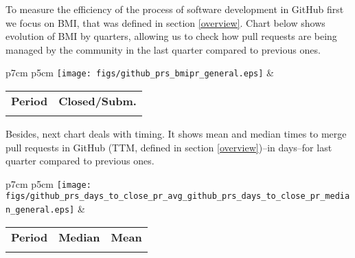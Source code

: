 To measure the efficiency of the process of software development in GitHub first we focus on BMI, that was defined in section \ref{overview}. Chart below shows evolution of BMI by quarters, allowing us to check how pull requests are being managed by the community in the last quarter compared to previous ones.

\begin{tabular}{p{7cm} p{5cm}}
	\vspace{0pt} 
	\texttt{[image: figs/github\_prs\_bmipr\_general.eps]}
	& 
	\vspace{0pt}
	\begin{tabular}{l|l}%
		\bfseries Period & \bfseries Closed/Subm. %
		\csvreader[head to column names]{data/github_prs_bmipr_general.csv}{}%
		{\\ & \bmipr}
	\end{tabular}
\end{tabular}

Besides, next chart deals with timing. It shows mean and median times to merge pull requests in GitHub (TTM, defined in section \ref{overview})--in days--for last quarter compared to previous ones.


\begin{tabular}{p{7cm} p{5cm}}
	\vspace{0pt} 
	\texttt{[image: figs/github\_prs\_days\_to\_close\_pr\_avg\_github\_prs\_days\_to\_close\_pr\_median\_general.eps]}
	& 
	\vspace{0pt}
	\begin{tabular}{l|r|r|}%
		\bfseries Period & \bfseries Median & \bfseries Mean %
		\csvreader[head to column names]{data/github_prs_days_to_close_pr_avg_github_prs_days_to_close_pr_median_general.csv}{}%
		{\\ & \daystocloseprmedian & \daystoclosepravg}
	\end{tabular}
\end{tabular}
